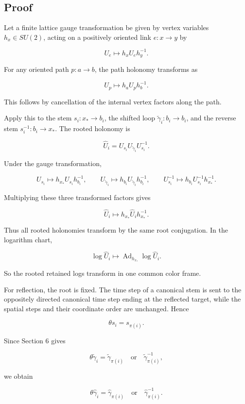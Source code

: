 \documentclass[10pt]{article}
\begin{document}
\subsection{Proof}

Let a finite lattice gauge transformation be given by vertex variables \(h_x\in SU(2)\), acting on a positively oriented link \(e:x\to y\) by

\[
U_e\mapsto h_xU_eh_y^{-1}.
\]

For any oriented path \(p:a\to b\), the path holonomy transforms as

\[
U_p\mapsto h_aU_ph_b^{-1}.
\]

This follows by cancellation of the internal vertex factors along the path.

Apply this to the stem \(s_i:x_\ast\to b_i\), the shifted loop \(\widetilde\gamma_i:b_i\to b_i\), and the reverse stem \(s_i^{-1}:b_i\to x_\ast\).  The rooted holonomy is

\[
\widehat U_i
=
U_{s_i}U_{\widetilde\gamma_i}U_{s_i}^{-1}.
\]

Under the gauge transformation,

\[
U_{s_i}\mapsto h_{x_\ast}U_{s_i}h_{b_i}^{-1},
\qquad
U_{\widetilde\gamma_i}\mapsto h_{b_i}U_{\widetilde\gamma_i}h_{b_i}^{-1},
\qquad
U_{s_i}^{-1}\mapsto h_{b_i}U_{s_i}^{-1}h_{x_\ast}^{-1}.
\]

Multiplying these three transformed factors gives

\[
\widehat U_i
\mapsto
h_{x_\ast}\widehat U_ih_{x_\ast}^{-1}.
\]

Thus all rooted holonomies transform by the same root conjugation.  In the logarithm chart,

\[
\log\widehat U_i
\mapsto
\operatorname{Ad}_{h_{x_\ast}}\log\widehat U_i.
\]

So the rooted retained logs transform in one common color frame.

For reflection, the root is fixed.  The time step of a canonical stem is sent to the oppositely directed canonical time step ending at the reflected target, while the spatial steps and their coordinate order are unchanged.  Hence

\[
\theta s_i=s_{\pi(i)}.
\]

Since Section 6 gives

\[
\theta\widetilde\gamma_i
=
\widetilde\gamma_{\pi(i)}
\quad\text{or}\quad
\widetilde\gamma_{\pi(i)}^{-1},
\]

we obtain

\[
\theta\widehat\gamma_i
=
\widehat\gamma_{\pi(i)}
\quad\text{or}\quad
\widehat\gamma_{\pi(i)}^{-1}.
\]
\end{document}
